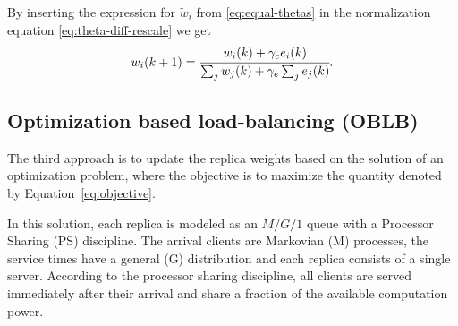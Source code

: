 By inserting the expression for $\tilde w_i$ from
\eqref{eq:equal-thetas} in the normalization equation
\eqref{eq:theta-diff-rescale} we get
\begin{equation}
  w_i(k+1)=\cfrac{w_i(k)+\gamma_ee_i(k)}{\sum_jw_j(k)+\gamma_e\sum_je_j(k)} .
\label{eq:weights}
\end{equation}


\subsection{Optimization based load-balancing (OBLB)}

The third approach is to update the replica weights based on the
solution of an optimization problem, where the objective is to
maximize the quantity denoted by Equation~\eqref{eq:objective}.

In this solution, each replica is modeled as an $M/G/1$ queue with a
Processor Sharing (PS) discipline. The arrival clients are Markovian
(M) processes, the service times have a general (G) distribution and
each replica consists of a single server. According to the processor
sharing discipline, all clients are served immediately after their
arrival and share a fraction of the available computation power.


